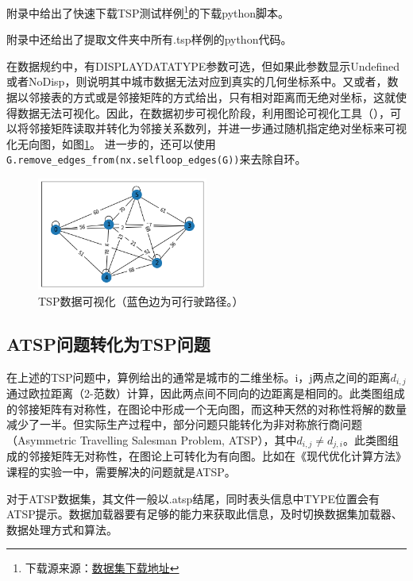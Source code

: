 \documentclass[lang=cn,11pt]{elegantpaper}
\begin{document}
附录中给出了快速下载TSP测试样例\footnote{下载源来源：\href{http://elib.zib.de/pub/mp-testdata/tsp/tsplib/tsp/index.html}{数据集下载地址}}的下载python脚本。

附录中还给出了提取文件夹中所有.tsp样例的python代码。

在数据规约中，有DISPLAYDATATYPE参数可选，但如果此参数显示Undefined或者NoDisp，则说明其中城市数据无法对应到真实的几何坐标系中。又或者，数据以邻接表的方式或是邻接矩阵的方式给出，只有相对距离而无绝对坐标，这就使得数据无法可视化。因此，在数据初步可视化阶段，利用图论可视化工具（\cite{NetworkXweb}），可以将邻接矩阵读取并转化为邻接关系数列，并进一步通过随机指定绝对坐标来可视化无向图，如图\ref{img:TSP数据可视化}。
进一步的，还可以使用\lstinline{G.remove_edges_from(nx.selfloop_edges(G))}来去除自环。

\begin{figure}[h]
  \centering
  \includegraphics[width=0.5\textwidth]{figure/TSP数据可视化.png} %
  \caption{TSP数据可视化（蓝色边为可行驶路径。）} %
  \label{img:TSP数据可视化} %
\end{figure}


\subsection{ATSP问题转化为TSP问题}

在上述的TSP问题中，算例给出的通常是城市的二维坐标。i，j两点之间的距离$d_{i,j}$通过欧拉距离（2-范数）计算，因此两点间不同向的边距离是相同的。此类图组成的邻接矩阵有对称性，在图论中形成一个无向图，而这种天然的对称性将解的数量减少了一半。但实际生产过程中，部分问题只能转化为非对称旅行商问题（Asymmetric Travelling Salesman Problem, ATSP），其中$d_{i,j}\neq d_{j,i}$。此类图组成的邻接矩阵无对称性，在图论上可转化为有向图。比如在《现代优化计算方法》课程的实验一中，需要解决的问题就是ATSP。

对于ATSP数据集，其文件一般以.atsp结尾，同时表头信息中TYPE位置会有ATSP提示。数据加载器要有足够的能力来获取此信息，及时切换数据集加载器、数据处理方式和算法。
\end{document}
